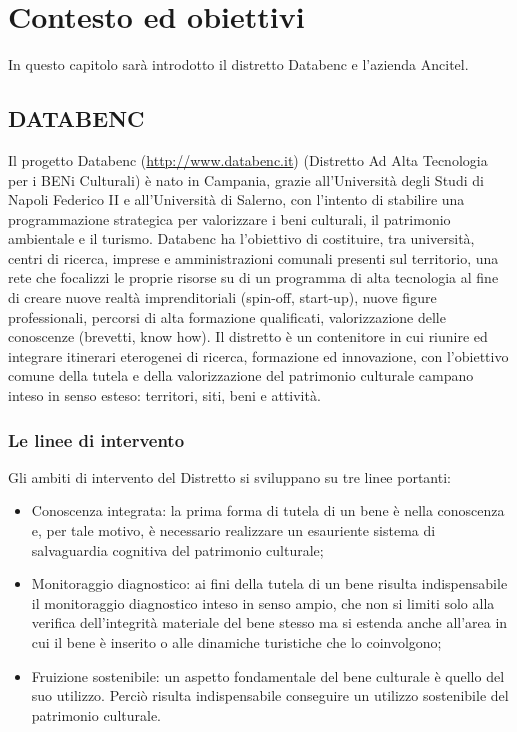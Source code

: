 
\chapter{Contesto ed obiettivi}
\label{ref:contesto}
In questo capitolo sarà introdotto il distretto Databenc e l'azienda Ancitel. 


\section{DATABENC}
Il progetto Databenc (\url{http://www.databenc.it}) (Distretto Ad Alta Tecnologia per i BENi Culturali) è nato in Campania, grazie all'Università degli Studi di Napoli Federico II e all'Università di Salerno, con l'intento di stabilire una programmazione strategica per valorizzare i beni culturali, il patrimonio ambientale e il turismo.
Databenc ha l'obiettivo di costituire, tra università, centri di ricerca, imprese e amministrazioni comunali presenti sul territorio, una rete che focalizzi le proprie risorse su di un programma di alta tecnologia al fine di creare nuove realtà imprenditoriali (spin-off, start-up), nuove figure professionali, percorsi di alta formazione qualificati, valorizzazione delle conoscenze (brevetti, know how). 
Il distretto è un contenitore in cui riunire ed integrare itinerari eterogenei di ricerca, formazione ed innovazione, con l'obiettivo comune della tutela e della valorizzazione del patrimonio culturale campano inteso in senso esteso: territori, siti, beni e attività. 
\subsection{Le linee di intervento}
Gli ambiti di intervento del Distretto si sviluppano su tre linee portanti: 
\begin{itemize}
\item Conoscenza integrata: la prima forma di tutela di un bene è nella conoscenza e, per tale motivo, è necessario realizzare un esauriente sistema di salvaguardia cognitiva del patrimonio culturale;
\item Monitoraggio diagnostico: ai fini della tutela di un bene risulta indispensabile il monitoraggio diagnostico inteso in senso ampio, che non si limiti solo alla verifica dell'integrità materiale del bene stesso ma si estenda anche all'area in cui il bene è inserito o alle dinamiche turistiche che lo coinvolgono;
\item Fruizione sostenibile: un aspetto fondamentale del bene culturale è quello del suo utilizzo.  Perciò risulta indispensabile conseguire un utilizzo sostenibile del patrimonio culturale.
\end{itemize}


